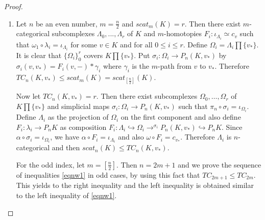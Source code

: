 \documentclass[preprint,11pt %
]{hjm1}
\theoremstyle{definition}
\begin{document}
\begin{proof}
\begin{enumerate}
\item
Let $n$ be an even number, $m = \frac{n}{2}$ and  $scat_{m} (K) = r$. Then there exist $m$-categorical subcomplexes $\Lambda _0,...,\Lambda _r$ of $K$ and $m$-homotopies $F_i :\iota_{\Lambda_i} \simeq c_{v}$ such that $\omega_1 \circ \lambda _i=\iota_{\Lambda _i}$ for some $v \in K$ and for all $0\leq i\leq r$. 
Define $\Omega _i =\Lambda _i \prod \lbrace v_* \rbrace $. It is clear that $\lbrace \Omega _i \rbrace _0 ^r$ covers $K\prod \lbrace  v_*\rbrace$. Put $\sigma _i:\Omega _i\to P_{n}(K,v_*)$ by $\sigma _i (v,v_*)=F_i(v, -) * \gamma_i$ where $\gamma_i$ is the $m$-path from $v$ to $v_*$. Therefore $TC_{n}(K, v_*) \le scat_m(K) = scat_{[\frac{n}{2}]} (K)$.


Now let $TC_{n} (K, v_*) = r$. Then there exist subcomplexes $\Omega_0, \ldots, \Omega_r$ of $K \prod \{v_*\}$ and simplicial maps $\sigma_i: \Omega_i \to P_{n} (K,v_*)$ such that $\pi_{n} \circ \sigma_i = \iota_{\Omega_i}$. Define $\Lambda_i$ as the projection of $\Omega_i$ on the first component and  also define $F_i: \lambda_i \to P_{n} K$ as composition $F_i: \Lambda_i \hookrightarrow \Omega_i \to^{\sigma_i} P_{n}(K, v_*) \hookrightarrow P_{n} K$.  Since $\alpha \circ \sigma_i = \iota_{\Omega_i}$, we have $\alpha \circ F_i = \iota_{\Lambda_i}$ and also $\omega \circ F_i = c_{v_*}$. Therefore $\Lambda_i$ is $n$-categorical and then $scat_{n} (K) \le TC_{n} (K, v_*)$. 

For the odd index, let $m = [\frac{n}{2}]$. Then $n = 2m +1$ and we prove the sequence of inequalities \eqref{eqnw1} in odd cases, 
by using this fact that $TC_{2m +1} \le TC_{2m}$. This yields to the right inequality and the left inequality is obtained similar to the left inequality of 
\eqref{eqnw1}.
%
%
%


\end{enumerate}
\end{proof}
\end{document}
